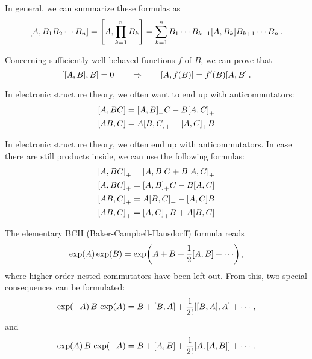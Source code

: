         In general, we can summarize these formulas as
        \begin{equation}
            \comm{A}{B_1 B_2 \cdots B_n} = \comm{A}{\prod_{k=1}^n B_k} = \sum_{k=1}^n B_1 \cdots B_{k-1} \comm{A}{B_k} B_{k+1} \cdots B_n \thinspace .
        \end{equation}

        Concerning sufficiently well-behaved functions $f$ of $B$, we can prove that
        \begin{equation}
            \comm{\comm{A}{B}}{B} = 0 \qquad\Rightarrow\qquad \comm{A}{f(B)} = f'(B) \comm{A}{B} \thinspace .
        \end{equation}

        In electronic structure theory, we often want to end up with anticommutators:
        \begin{align}
            & \comm{A}{BC} = \comm{A}{B}_+ C - B \comm{A}{C}_+ \\
            & \comm{AB}{C} = A \comm{B}{C}_+ - \comm{A}{C}_+ B
        \end{align}

        In electronic structure theory, we often end up with anticommutators. In case there are still products inside, we can use the following formulas:
        \begin{align}
            & \comm{A}{BC}_+ = \comm{A}{B} C + B \comm{A}{C}_+ \\
            & \comm{A}{BC}_+ = \comm{A}{B}_+ C - B \comm{A}{C} \\
            & \comm{AB}{C}_+ = A \comm{B}{C}_+ - \comm{A}{C} B \\
            & \comm{AB}{C}_+ = \comm{A}{C}_+ B + A \comm{B}{C}
        \end{align}

        The elementary BCH (Baker-Campbell-Hausdorff) formula reads
        \begin{equation}
            \exp(A) \exp(B) = \exp(A + B + \frac{1}{2} \comm{A}{B} + \cdots) \thinspace ,
        \end{equation}
        where higher order nested commutators have been left out. From this, two special consequences can be formulated:
        \begin{equation}
            \exp(-A) \thinspace B \thinspace \exp(A) = B + \comm{B}{A} + \frac{1}{2!} \comm{\comm{B}{A}}{A} + \cdots \thinspace ,
        \end{equation}
        and
        \begin{equation}
            \exp(A) \thinspace B \thinspace \exp(-A) = B + \comm{A}{B} + \frac{1}{2!} \comm{A}{\comm{A}{B}} + \cdots \thinspace .
        \end{equation}
